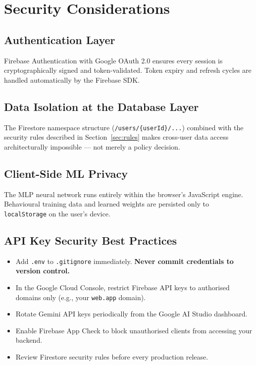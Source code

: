 \documentclass[12pt,a4paper]{report}
\begin{document}
\chapter{Security Considerations}
\label{ch:security}

\section{Authentication Layer}
Firebase Authentication with Google OAuth 2.0 ensures every session is cryptographically signed and token-validated. Token expiry and refresh cycles are handled automatically by the Firebase SDK.

\section{Data Isolation at the Database Layer}
The Firestore namespace structure (\texttt{/users/\{userId\}/...}) combined with the security rules described in Section~\ref{sec:rules} makes cross-user data access architecturally impossible — not merely a policy decision.

\section{Client-Side ML Privacy}
The MLP neural network runs entirely within the browser's JavaScript engine. Behavioural training data and learned weights are persisted only to \texttt{localStorage} on the user's device.

\section{API Key Security Best Practices}

\begin{tcolorbox}[warningbox, title={Important Security Guidelines}]
\begin{itemize}[noitemsep, topsep=4pt]
  \item Add \texttt{.env} to \texttt{.gitignore} immediately. \textbf{Never commit credentials to version control.}
  \item In the Google Cloud Console, restrict Firebase API keys to authorised domains only (e.g., your \texttt{web.app} domain).
  \item Rotate Gemini API keys periodically from the Google AI Studio dashboard.
  \item Enable Firebase App Check to block unauthorised clients from accessing your backend.
  \item Review Firestore security rules before every production release.
\end{itemize}
\end{tcolorbox}
\end{document}

